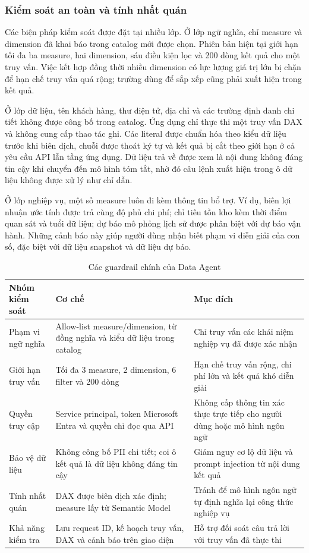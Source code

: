 \subsubsection{Kiểm soát an toàn và tính nhất quán}

Các biện pháp kiểm soát được đặt tại nhiều lớp. Ở lớp ngữ nghĩa, chỉ measure và dimension đã khai báo trong catalog mới được chọn. Phiên bản hiện tại giới hạn tối đa ba measure, hai dimension, sáu điều kiện lọc và 200 dòng kết quả cho một truy vấn. Việc kết hợp đồng thời nhiều dimension có lực lượng giá trị lớn bị chặn để hạn chế truy vấn quá rộng; trường dùng để sắp xếp cũng phải xuất hiện trong kết quả.

Ở lớp dữ liệu, tên khách hàng, thư điện tử, địa chỉ và các trường định danh chi tiết không được công bố trong catalog. Ứng dụng chỉ thực thi một truy vấn DAX và không cung cấp thao tác ghi. Các literal được chuẩn hóa theo kiểu dữ liệu trước khi biên dịch, chuỗi được thoát ký tự và kết quả bị cắt theo giới hạn ở cả yêu cầu API lẫn tầng ứng dụng. Dữ liệu trả về được xem là nội dung không đáng tin cậy khi chuyển đến mô hình tóm tắt, nhờ đó câu lệnh xuất hiện trong ô dữ liệu không được xử lý như chỉ dẫn.

Ở lớp nghiệp vụ, một số measure luôn đi kèm thông tin bổ trợ. Ví dụ, biên lợi nhuận ước tính được trả cùng độ phủ chi phí; chỉ tiêu tồn kho kèm thời điểm quan sát và tuổi dữ liệu; dự báo mô phỏng lịch sử được phân biệt với dự báo vận hành. Những cảnh báo này giúp người dùng nhận biết phạm vi diễn giải của con số, đặc biệt với dữ liệu snapshot và dữ liệu dự báo.

\begin{table}[H]\centering
\caption{Các guardrail chính của Data Agent}
\label{tab:data-agent-guardrails}
\begin{tabularx}{\textwidth}{|p{3.5cm}|X|p{4.2cm}|}\hline
\textbf{Nhóm kiểm soát} & \textbf{Cơ chế} & \textbf{Mục đích} \\ \hline
Phạm vi ngữ nghĩa & Allow-list measure/dimension, từ đồng nghĩa và kiểu dữ liệu trong catalog & Chỉ truy vấn các khái niệm nghiệp vụ đã được xác nhận \\ \hline
Giới hạn truy vấn & Tối đa 3 measure, 2 dimension, 6 filter và 200 dòng & Hạn chế truy vấn rộng, chi phí lớn và kết quả khó diễn giải \\ \hline
Quyền truy cập & Service principal, token Microsoft Entra và quyền chỉ đọc qua API & Không cấp thông tin xác thực trực tiếp cho người dùng hoặc mô hình ngôn ngữ \\ \hline
Bảo vệ dữ liệu & Không công bố PII chi tiết; coi ô kết quả là dữ liệu không đáng tin cậy & Giảm nguy cơ lộ dữ liệu và prompt injection từ nội dung kết quả \\ \hline
Tính nhất quán & DAX được biên dịch xác định; measure lấy từ Semantic Model & Tránh để mô hình ngôn ngữ tự định nghĩa lại công thức nghiệp vụ \\ \hline
Khả năng kiểm tra & Lưu request ID, kế hoạch truy vấn, DAX và cảnh báo trên giao diện & Hỗ trợ đối soát câu trả lời với truy vấn đã thực thi \\ \hline
\end{tabularx}
\end{table}

